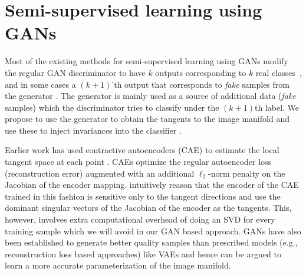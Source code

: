 \documentclass{article}
\begin{document}
\section{Semi-supervised learning using GANs}%
Most of the existing methods for semi-supervised learning using GANs modify the regular GAN discriminator to have $k$ outputs corresponding to $k$ real classes~\cite{springenberg2015unsupervised}, and in some cases a $(k+1)$'th output that corresponds to \emph{fake} samples from the generator \cite{salimans2016improved,odena2016semi,dumoulin2016adversarially}. The generator is mainly used as a source of additional data (\emph{fake} samples) which the discriminator tries to classify under the $(k+1)$th label. We propose to use the generator to obtain the tangents to the image manifold and use these to inject invariances into the classifier \cite{simard1998transformation}.

Earlier work has used contractive autoencoders (CAE) to estimate the local tangent space at each point \cite{rifai2011manifold}. CAEs optimize the regular autoencoder loss (reconstruction error) augmented with an additional $\ell_2$-norm penalty on the Jacobian of the encoder mapping. \citet{rifai2011manifold} intuitively reason that the encoder of the CAE trained in this fashion is sensitive only to the tangent directions and use the dominant singular vectors of the Jacobian of the encoder as the tangents. This, however, involves extra computational overhead of doing an SVD for every training sample which we will avoid in our GAN based approach. GANs have also been established to generate better quality samples than prescribed models (e.g., reconstruction loss based approaches) like VAEs \cite{kingma2013auto} and hence can be argued to learn a more accurate parameterization of the image manifold.
\end{document}
